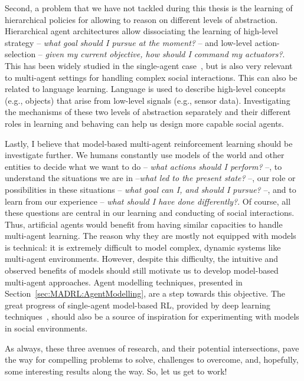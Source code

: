 Second, a problem that we have not tackled during this thesis is the learning of hierarchical policies for allowing to reason on different levels of abstraction. Hierarchical agent architectures allow dissociating the learning of high-level strategy -- \textit{what goal should I pursue at the moment?} -- and low-level action-selection -- \textit{given my current objective, how should I command my actuators?}. This has been widely studied in the single-agent case~\citep{Pateria2021_HRLSurvey}, but is also very relevant to multi-agent settings for handling complex social interactions. This can also be related to language learning. Language is used to describe high-level concepts (e.g., objects) that arise from low-level signals (e.g., sensor data). Investigating the mechanisms of these two levels of abstraction separately and their different roles in learning and behaving can help us design more capable social agents. 



Lastly, I believe that model-based multi-agent reinforcement learning should be investigate further. We humans constantly use models of the world and other entities to decide what we want to do -- \textit{what actions should I perform?} --, to understand the situations we are in --\textit{what led to the present state?} --, our role or possibilities in these situations -- \textit{what goal can I, and should I pursue?} --, and to learn from our experience -- \textit{what should I have done differently?}. Of course, all these questions are central in our learning and conducting of social interactions. Thus, artificial agents would benefit from having similar capacities to handle multi-agent learning. The reason why they are mostly not equipped with models is technical: it is extremely difficult to model complex, dynamic systems like multi-agent environments. However, despite this difficulty, the intuitive and observed benefits of models should still motivate us to develop model-based multi-agent approaches. Agent modelling techniques, presented in Section~\ref{sec:MADRL:AgentModelling}, are a step towards this objective. The great progress of single-agent model-based RL, provided by deep learning techniques~\citep{Hafner2023_DreamerV3}, should also be a source of inspiration for experimenting with models in social environments. 


As always, these three avenues of research, and their potential intersections, pave the way for compelling problems to solve, challenges to overcome, and, hopefully, some interesting results along the way. So, let us get to work!



